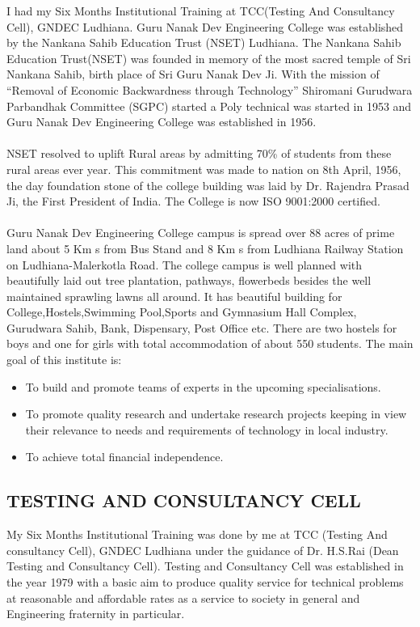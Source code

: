 
I had my Six Months Institutional Training at TCC(Testing And Consultancy Cell), GNDEC
Ludhiana. Guru Nanak Dev Engineering College was established by the Nankana Sahib
Education Trust (NSET) Ludhiana. The Nankana Sahib Education Trust(NSET) was founded in
memory of the most sacred temple of Sri Nankana Sahib, birth place of Sri Guru Nanak Dev Ji.
With the mission of “Removal of Economic Backwardness through Technology” Shiromani
Gurudwara Parbandhak Committee (SGPC) started a Poly technical was started in 1953 and
Guru Nanak Dev Engineering College was established in 1956.\\\\
NSET resolved to uplift Rural areas by admitting 70\% of students from these rural areas ever
year. This commitment was made to nation on 8th April, 1956, the day foundation stone of the
college building was laid by Dr. Rajendra Prasad Ji, the First President of India. The College is
now ISO 9001:2000 certified.\\\\

Guru Nanak Dev Engineering College campus is spread over 88 acres of prime land about 5
Km s from Bus Stand and 8 Km s from Ludhiana Railway Station on Ludhiana-Malerkotla
Road. The college campus is well planned with beautifully laid out tree plantation, pathways,
flowerbeds besides the well maintained sprawling lawns all around. It has beautiful building for
College,Hostels,Swimming Pool,Sports and Gymnasium Hall Complex, Gurudwara Sahib,
Bank, Dispensary, Post Office etc. There are two hostels for boys and one for girls with total
accommodation of about 550 students. The main goal of this institute is:\\
\begin{itemize}
\item To build and promote teams of experts in the upcoming specialisations.
\item To promote quality research and undertake research projects keeping in view their
relevance to needs and requirements of technology in local industry.
\item To achieve total financial independence.
\end{itemize}

\subsection{TESTING AND CONSULTANCY CELL}
My Six Months Institutional Training was done by me at TCC (Testing And consultancy Cell),
GNDEC Ludhiana under the guidance of Dr. H.S.Rai (Dean Testing and Consultancy Cell).
Testing and Consultancy Cell was established in the year 1979 with a basic aim to produce
quality service for technical problems at reasonable and affordable rates as a service to society
in general and Engineering fraternity in particular.\\ \\

